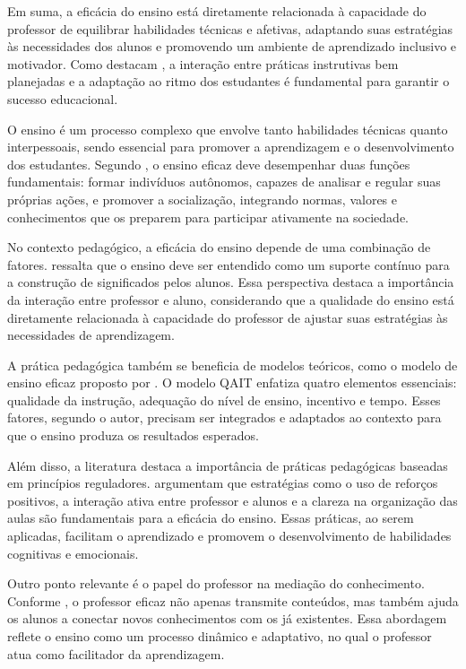 Em suma, a eficácia do ensino está diretamente relacionada à capacidade do professor de equilibrar habilidades técnicas e afetivas, adaptando suas estratégias às necessidades dos alunos e promovendo um ambiente de aprendizado inclusivo e motivador. Como destacam \cite{RosenshineStevens1986}, a interação entre práticas instrutivas bem planejadas e a adaptação ao ritmo dos estudantes é fundamental para garantir o sucesso educacional.

O ensino é um processo complexo que envolve tanto habilidades técnicas quanto interpessoais, sendo essencial para promover a aprendizagem e o desenvolvimento dos estudantes. Segundo \cite{DubetMartucelli1996}, o ensino eficaz deve desempenhar duas funções fundamentais: formar indivíduos autônomos, capazes de analisar e regular suas próprias ações, e promover a socialização, integrando normas, valores e conhecimentos que os preparem para participar ativamente na sociedade.

No contexto pedagógico, a eficácia do ensino depende de uma combinação de fatores. \cite{Scheerens2004} ressalta que o ensino deve ser entendido como um suporte contínuo para a construção de significados pelos alunos. Essa perspectiva destaca a importância da interação entre professor e aluno, considerando que a qualidade do ensino está diretamente relacionada à capacidade do professor de ajustar suas estratégias às necessidades de aprendizagem.

A prática pedagógica também se beneficia de modelos teóricos, como o modelo de ensino eficaz proposto por \cite{Slavin1986}. O modelo QAIT enfatiza quatro elementos essenciais: qualidade da instrução, adequação do nível de ensino, incentivo e tempo. Esses fatores, segundo o autor, precisam ser integrados e adaptados ao contexto para que o ensino produza os resultados esperados.

Além disso, a literatura destaca a importância de práticas pedagógicas baseadas em princípios reguladores. \cite{BrophyGood1986} argumentam que estratégias como o uso de reforços positivos, a interação ativa entre professor e alunos e a clareza na organização das aulas são fundamentais para a eficácia do ensino. Essas práticas, ao serem aplicadas, facilitam o aprendizado e promovem o desenvolvimento de habilidades cognitivas e emocionais.

Outro ponto relevante é o papel do professor na mediação do conhecimento. Conforme \cite{MarchesiMartin2003}, o professor eficaz não apenas transmite conteúdos, mas também ajuda os alunos a conectar novos conhecimentos com os já existentes. Essa abordagem reflete o ensino como um processo dinâmico e adaptativo, no qual o professor atua como facilitador da aprendizagem.

